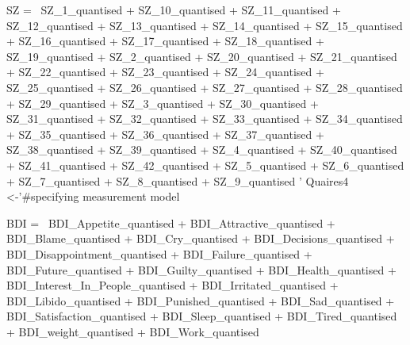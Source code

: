 \documentclass[]{article}
\newenvironment{Shaded}{\begin{snugshade}}{\end{snugshade}}
\newcommand{\StringTok}[1]{\textcolor[rgb]{0.31,0.60,0.02}{#1}}
\newcommand{\NormalTok}[1]{#1}
\begin{document}
\begin{Shaded}
\begin{Highlighting}[]
\StringTok{SZ =~ SZ_1_quantised    +}
\StringTok{      SZ_10_quantised   +   }
\StringTok{      SZ_11_quantised + }
\StringTok{      SZ_12_quantised + }
\StringTok{      SZ_13_quantised + }
\StringTok{      SZ_14_quantised + }
\StringTok{      SZ_15_quantised + }
\StringTok{      SZ_16_quantised + }
\StringTok{      SZ_17_quantised + }
\StringTok{      SZ_18_quantised + }
\StringTok{      SZ_19_quantised + }
\StringTok{      SZ_2_quantised + }
\StringTok{      SZ_20_quantised + }
\StringTok{      SZ_21_quantised + }
\StringTok{      SZ_22_quantised + }
\StringTok{      SZ_23_quantised + }
\StringTok{      SZ_24_quantised + }
\StringTok{      SZ_25_quantised + }
\StringTok{      SZ_26_quantised + }
\StringTok{      SZ_27_quantised + }
\StringTok{      SZ_28_quantised + }
\StringTok{      SZ_29_quantised + }
\StringTok{      SZ_3_quantised + }
\StringTok{      SZ_30_quantised + }
\StringTok{      SZ_31_quantised + }
\StringTok{      SZ_32_quantised + }
\StringTok{      SZ_33_quantised + }
\StringTok{      SZ_34_quantised + }
\StringTok{      SZ_35_quantised + }
\StringTok{      SZ_36_quantised + }
\StringTok{      SZ_37_quantised + }
\StringTok{      SZ_38_quantised + }
\StringTok{      SZ_39_quantised + }
\StringTok{      SZ_4_quantised + }
\StringTok{      SZ_40_quantised + }
\StringTok{      SZ_41_quantised + }
\StringTok{      SZ_42_quantised + }
\StringTok{      SZ_5_quantised + }
\StringTok{      SZ_6_quantised + }
\StringTok{      SZ_7_quantised + }
\StringTok{      SZ_8_quantised + }
\StringTok{      SZ_9_quantised}
\StringTok{'}
\NormalTok{Quaires4 <-}\StringTok{'#specifying measurement model}

\StringTok{BDI =~ BDI_Appetite_quantised   + }
\StringTok{       BDI_Attractive_quantised + }
\StringTok{       BDI_Blame_quantised  + }
\StringTok{       BDI_Cry_quantised    +   }
\StringTok{       BDI_Decisions_quantised  +   }
\StringTok{       BDI_Disappointment_quantised +   }
\StringTok{       BDI_Failure_quantised    +   }
\StringTok{       BDI_Future_quantised +   }
\StringTok{       BDI_Guilty_quantised +   }
\StringTok{       BDI_Health_quantised +   }
\StringTok{       BDI_Interest_In_People_quantised +   }
\StringTok{       BDI_Irritated_quantised  +   }
\StringTok{       BDI_Libido_quantised +   }
\StringTok{       BDI_Punished_quantised   +   }
\StringTok{       BDI_Sad_quantised + }
\StringTok{       BDI_Satisfaction_quantised   +   }
\StringTok{       BDI_Sleep_quantised  +   }
\StringTok{       BDI_Tired_quantised  +   }
\StringTok{       BDI_weight_quantised +   }
\StringTok{       BDI_Work_quantised   }


\end{Highlighting}
\end{Shaded}
\end{document}
